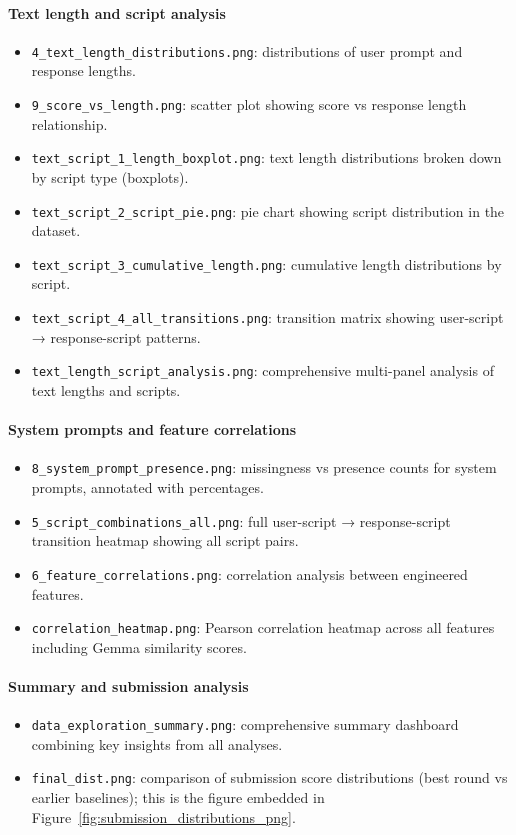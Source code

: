\documentclass[11pt]{article}
\begin{document}
\paragraph{Text length and script analysis}
\begin{itemize}[leftmargin=1.5em]
  \item \texttt{4\_text\_length\_distributions.png}: distributions of user prompt and response lengths.
  \item \texttt{9\_score\_vs\_length.png}: scatter plot showing score vs response length relationship.
  \item \texttt{text\_script\_1\_length\_boxplot.png}: text length distributions broken down by script type (boxplots).
  \item \texttt{text\_script\_2\_script\_pie.png}: pie chart showing script distribution in the dataset.
  \item \texttt{text\_script\_3\_cumulative\_length.png}: cumulative length distributions by script.
  \item \texttt{text\_script\_4\_all\_transitions.png}: transition matrix showing user-script → response-script patterns.
  \item \texttt{text\_length\_script\_analysis.png}: comprehensive multi-panel analysis of text lengths and scripts.
\end{itemize}

\paragraph{System prompts and feature correlations}
\begin{itemize}[leftmargin=1.5em]
  \item \texttt{8\_system\_prompt\_presence.png}: missingness vs presence counts for system prompts, annotated with percentages.
  \item \texttt{5\_script\_combinations\_all.png}: full user-script → response-script transition heatmap showing all script pairs.
  \item \texttt{6\_feature\_correlations.png}: correlation analysis between engineered features.
  \item \texttt{correlation\_heatmap.png}: Pearson correlation heatmap across all features including Gemma similarity scores.
\end{itemize}

\paragraph{Summary and submission analysis}
\begin{itemize}[leftmargin=1.5em]
  \item \texttt{data\_exploration\_summary.png}: comprehensive summary dashboard combining key insights from all analyses.
  \item \texttt{final\_dist.png}: comparison of submission score distributions (best round vs earlier baselines); this is the figure embedded in Figure~\ref{fig:submission_distributions_png}.
\end{itemize}
\end{document}
